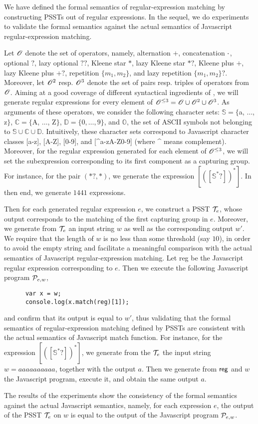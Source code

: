 
We have defined the formal semantics of regular-expression matching by constructing PSSTs out of regular expressions. 
In the sequel, we do experiments to validate the formal semantics against the actual semantics of Javascript regular-expression matching.

Let $\mathscr{O}$ denote the set of {\regexp} operators, namely, alternation $+$, concatenation $\cdot$, optional $?$, lazy optional $??$, Kleene star $*$, lazy Kleene star $*?$, Kleene plus $+$, lazy Kleene plus $+?$, repetition $\{m_1,m_2\}$, and lazy repetition $\{m_1,m_2\}?$. Moreover, let $\mathscr{O}^{2}$ resp. $\mathscr{O}^{3}$ denote the set of pairs resp. triples of operators from $\mathscr{O}$. 
Aiming at a good coverage of different syntactical ingredients of {\regexp}, we will generate regular expressions for every element of $\mathscr{O}^{\le 3} = \mathscr{O} \cup \mathscr{O}^2 \cup \mathscr{O}^3$.
As arguments of these operators, we consider the following character sets: $\mathbb{S} = \{$a, $\ldots$, z$\}$, $\mathbb{C}=\{$A, $\ldots$, Z$\}$, $\mathbb{D} = \{0,\ldots,9\}$, and $\mathbb{O}$, the set of ASCII symbols not belonging to $\mathbb{S} \cup \mathbb{C} \cup \mathbb{D}$.
Intuitively, these character sets correspond to Javascript character classes [a-z], [A-Z], [0-9], and [{\textasciicircum}a-zA-Z0-9] (where {\textasciicircum} means complement).
Moreover, for the regular expression generated for each element of $\mathscr{O}^{\le 3}$, we will set the subexpression corresponding to its first component as a capturing group. 
For instance, for the pair $(*?, *)$, we generate the {\regexp} expression $[([\mathbb{S}^*?])^{*}]$. In then end, we generate $1441$ {\regexp} expressions. 

Then for each generated regular expression $e$, we construct a PSST $\mathcal{T}_e$, whose output corresponds to the matching of the first capturing group in $e$.  Moreover, we generate from $\mathcal{T}_e$ an input string $w$ as well as the corresponding output $w'$. We require that the length of $w$ is no less than some threshold (say $10$), in order to avoid the empty string and facilitate a  meaningful comparison with the actual semantics of Javascript regular-expression matching. 
Let {\sf reg} be the Javascript regular expression corresponding to $e$. Then we execute the following Javascript program $\mathcal{P}_{e,w}$,
\begin{center}
{
\small
\begin{verbatim}
      var x = w; 
      console.log(x.match(reg)[1]);
\end{verbatim}
}
\end{center}
and confirm that its output is equal to $w'$, thus validating that the formal semantics of  regular-expression matching defined by PSSTs are consistent with the actual semantics of Javascript {\sf match} function. For instance, for the {\regexp} expression $[([\mathbb{S}^*?])^{*}]$, we generate from the $\mathcal{T}_e$ the input string $w= aaaaaaaaaa$, together with the output $a$. Then we generate from ${\sf reg}$ and $w$ the Javascript program, execute it, and obtain the same output $a$.

The results of the experiments show the consistency of the formal semantics against the actual Javascript semantics, namely, for each {\regexp} expression $e$, the output of the PSST $\mathcal{T}_e$ on $w$ is equal to the output of the Javascript program $\mathcal{P}_{e,w}$.